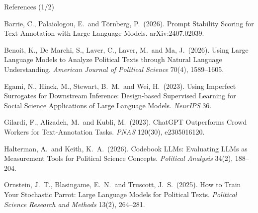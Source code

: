 
\begin{frame}{References (1/2)}

{\scriptsize

Barrie, C., Palaiologou, E.\ and T\"ornberg, P.\ (2026). Prompt Stability Scoring for Text Annotation with Large Language Models. arXiv:2407.02039.

\vspace{0.08cm}

Benoit, K., De Marchi, S., Laver, C., Laver, M.\ and Ma, J.\ (2026). Using Large Language Models to Analyze Political Texts through Natural Language Understanding. \textit{American Journal of Political Science} 70(4), 1589--1605.

\vspace{0.08cm}

Egami, N., Hinck, M., Stewart, B.\ M.\ and Wei, H.\ (2023). Using Imperfect Surrogates for Downstream Inference: Design-based Supervised Learning for Social Science Applications of Large Language Models. \textit{NeurIPS} 36.

\vspace{0.08cm}

Gilardi, F., Alizadeh, M.\ and Kubli, M.\ (2023). ChatGPT Outperforms Crowd Workers for Text-Annotation Tasks. \textit{PNAS} 120(30), e2305016120.

\vspace{0.08cm}

Halterman, A.\ and Keith, K.\ A.\ (2026). Codebook LLMs: Evaluating LLMs as Measurement Tools for Political Science Concepts. \textit{Political Analysis} 34(2), 188--204.

\vspace{0.08cm}


\vspace{0.08cm}

Ornstein, J.\ T., Blasingame, E.\ N.\ and Truscott, J.\ S.\ (2025). How to Train Your Stochastic Parrot: Large Language Models for Political Texts. \textit{Political Science Research and Methods} 13(2), 264--281.

}

\end{frame}


